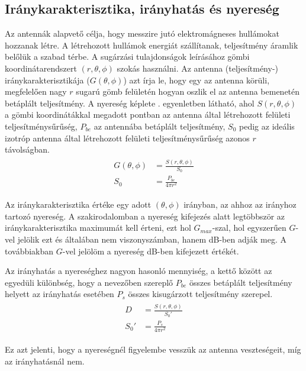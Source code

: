 	\subsection{Iránykarakterisztika, irányhatás és nyereség}
		\par Az antennák alapvető célja, hogy messzire jutó elektromágneses hullámokat hozzanak létre. A létrehozott hullámok energiát szállítanak, teljesítmény áramlik belőlük a szabad térbe. A sugárzási tulajdonságok leírásához gömbi koordinátarendszert $(r, \theta, \phi)$ szokás használni. Az antenna (teljesítmény-) iránykarakterisztikája ($G(\theta, \phi)$) azt írja le, hogy egy az antenna körüli, megfelelően nagy $r$ sugarú gömb felületén hogyan oszlik el az antenna bemenetén betáplált teljesítmény. A nyereség képlete . egyenletben látható, ahol $S(r,\theta,\phi)$ a gömbi koordinátákkal megadott pontban az antenna által létrehozott felületi teljesítménysűrűség, $P_{be}$ az antennába betáplált teljesítmény, $S_0$ pedig az ideális izotróp antenna által létrehozott felületi teljesítménysűrűség azonos $r$ távolságban.
		\begin{align}
			\begin{split}
				\label{equ:G}
				G(\theta,\phi) & = \frac{S(r,\theta,\phi)}{S_0}\\
				S_0 & = \frac{P_{be}}{4\pi r^2}
			\end{split}
		\end{align}
		\par Az iránykarakterisztika értéke egy adott $(\theta, \phi)$ irányban, az ahhoz az irányhoz tartozó nyereség. A szakirodalomban a nyereség kifejezés alatt legtöbbször az iránykarakterisztika maximumát kell érteni, ezt hol $G_{max}$-szal, hol egyszerűen $G$-vel jelölik ezt és általában nem viszonyszámban, hanem dB-ben adják meg. A továbbiakban $G$-vel jelölöm a nyereség dB-ben kifejezett értékét.
		\par Az irányhatás a nyereséghez nagyon hasonló mennyiség, a kettő között az egyedüli különbség, hogy a nevezőben szereplő $P_{be}$ összes betáplált teljesítmény helyett az irányhatás esetében $P_{s}$ összes kisugárzott teljesítmény szerepel.
		\begin{align}
			\begin{split}\label{equ:D}
				D & = \frac{S(r,\theta,\phi)}{S_0'}\\
				S_0' & = \frac{P_s}{4\pi r^2}
			\end{split}
		\end{align}
		\par Ez azt jelenti, hogy a nyereségnél figyelembe vesszük az antenna veszteségeit, míg az irányhatásnál nem.
